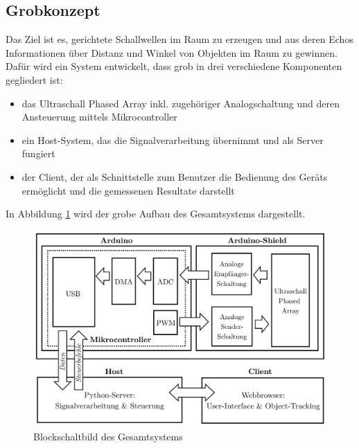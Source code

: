 \subsection{Grobkonzept}\label{sec:grobkonzept}
Das Ziel ist es, gerichtete Schallwellen im Raum zu erzeugen und aus deren Echos Informationen über Distanz und Winkel von Objekten im Raum zu gewinnen. Dafür wird ein System entwickelt, dass  grob in drei verschiedene Komponenten gegliedert ist:

\begin{itemize}
	\item das Ultraschall Phased Array inkl. zugehöriger Analogschaltung und deren Ansteuerung mittels Mikrocontroller
	\item ein Host-System, das die Signalverarbeitung übernimmt und als Server fungiert
	\item der Client, der als Schnittstelle zum Benutzer die Bedienung des Geräts ermöglicht und die gemessenen Resultate darstellt
\end{itemize}

In Abbildung \ref{fig:image_grundlagen_schema} wird der grobe Aufbau des Gesamtsystems dargestellt.

\begin{figure}[htb]
\begin{center}
\includegraphics[width=\textwidth]{graphics/image_grundlagen_schema.png}
\end{center}
\caption{Blockschaltbild des Gesamtsystems} %
\label{fig:image_grundlagen_schema}
\end{figure}
%

